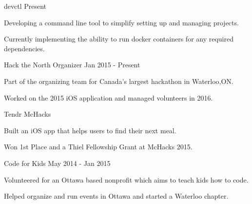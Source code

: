 

\begin{cventries}

  \cvprojectentry
    {devctl} %
    {Present}
    {
      \begin{cvitems} %
        \item {Developing a command line tool to simplify setting up and managing projects.}
        \item {Currently implementing the ability to run docker containers for any required dependencies.}
      \end{cvitems}
    }

  \cvprojectentry
	{Hack the North Organizer}    
	{Jan 2015 - Present}
    {
      \begin{cvitems} %
        \item {Part of the organizing team for Canada's largest hackathon in Waterloo,ON.}
        \item {Worked on the 2015 iOS application and managed volunteers in 2016.}
      \end{cvitems}
    }

  \cvprojectentry
    {Tendr} %
    {McHacks}
    {
      \begin{cvitems} %
        \item {Built an iOS app that helps users to find their next meal.}
        \item {Won 1st Place and a Thiel Fellowship Grant at McHacks 2015.}
      \end{cvitems}
    }

  \cvprojectentry
    {Code for Kids} %
    {May 2014 - Jan 2015}
    {
      \begin{cvitems} %
        \item {Volunteered for an Ottawa based nonprofit which aims to teach kids how to code.}
        \item {Helped organize and run events in Ottawa and started a Waterloo chapter.}
      \end{cvitems}
    }
  

\end{cventries}
